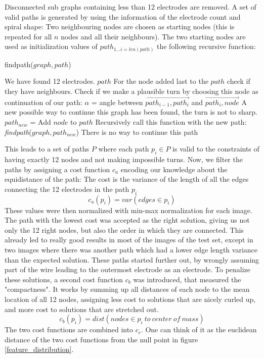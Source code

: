 \documentclass[a4paper, 10pt, twocolumn]{article}
\begin{document}
Disconnected sub graphs containing less than 12 electrodes are removed.
A set of valid paths is generated by using the information of the electrode count and spiral shape: Two neighbouring nodes are chosen as starting nodes (this is repeated for all $n$ nodes and all their neighbours). The two starting nodes are used as initialization values of $path_{1...i = len(path)} $ the following recursive function:

\begin{algorithm*}
	\caption{findpath($graph,path$)} 
	
	\begin{algorithmic}[1]
			 \State We have found 12 electrodes.
		\Return $path$
		\EndIf
		\State For the node added last to the $path$ check if they have neighbours.
				\State Check if we make a plausible turn by choosing this node as continuation of our path:
				\State $\alpha$ = angle between $\overrightarrow{path_{i-1}, path_i}$ and $\overrightarrow{path_i, node}$
					\State A new possible way to continue this graph has been found, the turn is not to sharp.
					\State $path_{new}$ = Add $node$ to $path$
					\State Recursively call this function with the new path:
					\State \emph{findpath}($graph,path_{new}$)
				\EndIf
		\EndFor
			\State There is no way to continue this path
			\Return
		\EndIf
		
	\end{algorithmic} 
	\label{pseudo_code}
\end{algorithm*}
This leads to a set of paths $P$ where each path $p_i \in P$ is valid to the constraints of having exactly 12 nodes and not making impossible turns. Now, we filter the paths by assigning a cost function $c_a$ encoding our knowledge about the equidistance of the path: The cost is the variance of the length of all the edges connecting the 12 electrodes in the path $p_i$
$$ c_a(p_i)=var(edges\in p_i)$$
These values were then normalized with min-max normalization for each image. The path with the lowest cost was accepted as the right solution, giving us not only the 12 right nodes, but also the order in which they are connected.
This already led to really good results in most of the images of the test set, except in two images where there was another path which had a lower edge length variance than the expected solution. These paths started further out, by wrongly assuming part of the wire leading to the outermost electrode as an electrode. To penalize these solutions, a second cost function $c_b$ was introduced, that measured the "compactness". It works by summing up all distances of each node to the mean location of all 12 nodes, assigning less cost to solutions that are nicely curled up, and more cost to solutions that are stretched out. 
$$ c_b(p_i)=dist (nodes \in p_i\ to\ center\ of\ mass)$$
The two cost functions are combined into $c_ {c}$. One can think of it as the euclidean distance of the two cost functions from the null point in figure \ref{feature_distribution}.
\end{document}
